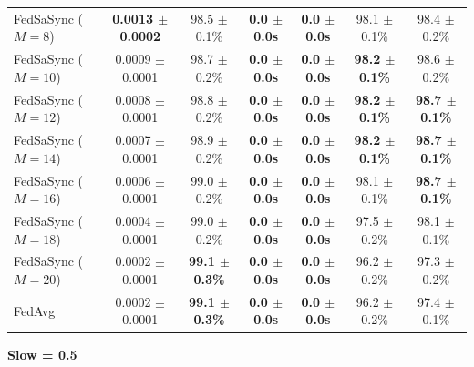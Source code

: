\begin{table}[t]
{\begin{tabular}{lcccccc}
\hline
FedSaSync ($M = 8$) & \textbf{0.0013 $\pm$ 0.0002} & 98.5 $\pm$ 0.1\% & \textbf{0.0 $\pm$ 0.0s} & \textbf{0.0 $\pm$ 0.0s} & 98.1 $\pm$ 0.1\% & 98.4 $\pm$ 0.2\% \\
FedSaSync ($M = 10$) & 0.0009 $\pm$ 0.0001 & 98.7 $\pm$ 0.2\% & \textbf{0.0 $\pm$ 0.0s} & \textbf{0.0 $\pm$ 0.0s} & \textbf{98.2 $\pm$ 0.1\%} & 98.6 $\pm$ 0.2\% \\
FedSaSync ($M = 12$) & 0.0008 $\pm$ 0.0001 & 98.8 $\pm$ 0.2\% & \textbf{0.0 $\pm$ 0.0s} & \textbf{0.0 $\pm$ 0.0s} & \textbf{98.2 $\pm$ 0.1\%} & \textbf{98.7 $\pm$ 0.1\%} \\
FedSaSync ($M = 14$) & 0.0007 $\pm$ 0.0001 & 98.9 $\pm$ 0.2\% & \textbf{0.0 $\pm$ 0.0s} & \textbf{0.0 $\pm$ 0.0s} & \textbf{98.2 $\pm$ 0.1\%} & \textbf{98.7 $\pm$ 0.1\%} \\
FedSaSync ($M = 16$) & 0.0006 $\pm$ 0.0001 & 99.0 $\pm$ 0.2\% & \textbf{0.0 $\pm$ 0.0s} & \textbf{0.0 $\pm$ 0.0s} & 98.1 $\pm$ 0.1\% & \textbf{98.7 $\pm$ 0.1\%} \\
FedSaSync ($M = 18$) & 0.0004 $\pm$ 0.0001 & 99.0 $\pm$ 0.2\% & \textbf{0.0 $\pm$ 0.0s} & \textbf{0.0 $\pm$ 0.0s} & 97.5 $\pm$ 0.2\% & 98.1 $\pm$ 0.1\% \\
FedSaSync ($M = 20$) & 0.0002 $\pm$ 0.0001 & \textbf{99.1 $\pm$ 0.3\%} & \textbf{0.0 $\pm$ 0.0s} & \textbf{0.0 $\pm$ 0.0s} & 96.2 $\pm$ 0.2\% & 97.3 $\pm$ 0.2\% \\
FedAvg & 0.0002 $\pm$ 0.0001 & \textbf{99.1 $\pm$ 0.3\%} & \textbf{0.0 $\pm$ 0.0s} & \textbf{0.0 $\pm$ 0.0s} & 96.2 $\pm$ 0.2\% & 97.4 $\pm$ 0.1\% \\
\hline
\end{tabular}%
}
\par\vspace{0.8em}
\noindent\textbf{Slow = 0.5} \\[0.2em]
\end{table}
